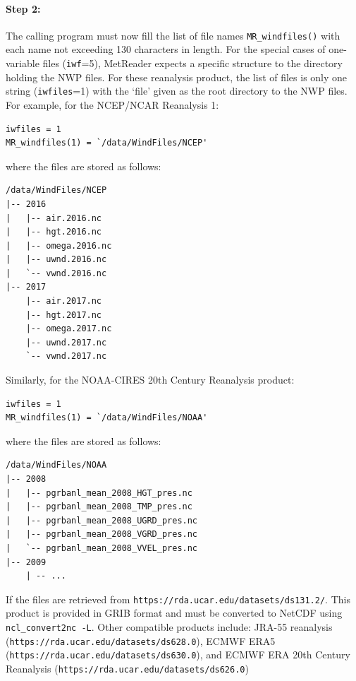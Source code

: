 \documentclass[11pt]{article}   %
\begin{document}
\paragraph{Step 2:} The calling program must now fill the list of file names \texttt{MR\_windfiles()}
with each name not exceeding 130 characters in length.  For the special cases of one-variable files (\texttt{iwf}=5),
MetReader expects
a specific structure to the directory holding the NWP files.  For these reanalysis product,
the list of files is only one string (\texttt{iwfiles}=1)
with the `file' given as the root directory to the NWP files.  For example, for the
NCEP/NCAR Reanalysis 1:
\begin{verbatim}
iwfiles = 1
MR_windfiles(1) = `/data/WindFiles/NCEP'
\end{verbatim}
where the files are stored as follows:
\begin{verbatim}
/data/WindFiles/NCEP
|-- 2016
|   |-- air.2016.nc
|   |-- hgt.2016.nc
|   |-- omega.2016.nc
|   |-- uwnd.2016.nc
|   `-- vwnd.2016.nc
|-- 2017
    |-- air.2017.nc
    |-- hgt.2017.nc
    |-- omega.2017.nc
    |-- uwnd.2017.nc
    `-- vwnd.2017.nc
\end{verbatim}
Similarly, for the NOAA-CIRES 20th Century Reanalysis product:
\begin{verbatim}
iwfiles = 1
MR_windfiles(1) = `/data/WindFiles/NOAA'
\end{verbatim}
where the files are stored as follows:
\begin{verbatim}
/data/WindFiles/NOAA
|-- 2008
|   |-- pgrbanl_mean_2008_HGT_pres.nc
|   |-- pgrbanl_mean_2008_TMP_pres.nc
|   |-- pgrbanl_mean_2008_UGRD_pres.nc
|   |-- pgrbanl_mean_2008_VGRD_pres.nc
|   `-- pgrbanl_mean_2008_VVEL_pres.nc
|-- 2009
    | -- ...
\end{verbatim}
If the files are retrieved from \texttt{https://rda.ucar.edu/datasets/ds131.2/}.  This product is
provided in GRIB format and must be converted to NetCDF using \texttt{ncl\_convert2nc -L}.
Other compatible products include:
JRA-55 reanalysis (\texttt{https://rda.ucar.edu/datasets/ds628.0}),
ECMWF ERA5 (\texttt{https://rda.ucar.edu/datasets/ds630.0}), and
ECMWF ERA 20th Century Reanalysis (\texttt{https://rda.ucar.edu/datasets/ds626.0})
\end{document}
